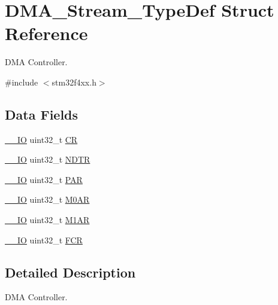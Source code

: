 \hypertarget{struct_d_m_a___stream___type_def}{\section{D\-M\-A\-\_\-\-Stream\-\_\-\-Type\-Def Struct Reference}
\label{struct_d_m_a___stream___type_def}
}


D\-M\-A Controller.  




{\ttfamily \#include $<$stm32f4xx.\-h$>$}

\subsection*{Data Fields}
\begin{DoxyCompactItemize}
\item 
\hyperlink{group___c_m_s_i_s__core__definitions_gaec43007d9998a0a0e01faede4133d6be}{\-\_\-\-\_\-\-I\-O} uint32\-\_\-t \hyperlink{struct_d_m_a___stream___type_def_ab40c89c59391aaa9d9a8ec011dd0907a}{C\-R}
\item 
\hyperlink{group___c_m_s_i_s__core__definitions_gaec43007d9998a0a0e01faede4133d6be}{\-\_\-\-\_\-\-I\-O} uint32\-\_\-t \hyperlink{struct_d_m_a___stream___type_def_af60258ad5a25addc1e8969665d0c1731}{N\-D\-T\-R}
\item 
\hyperlink{group___c_m_s_i_s__core__definitions_gaec43007d9998a0a0e01faede4133d6be}{\-\_\-\-\_\-\-I\-O} uint32\-\_\-t \hyperlink{struct_d_m_a___stream___type_def_aef55be3d948c22dd32a97e8d4f8761fd}{P\-A\-R}
\item 
\hyperlink{group___c_m_s_i_s__core__definitions_gaec43007d9998a0a0e01faede4133d6be}{\-\_\-\-\_\-\-I\-O} uint32\-\_\-t \hyperlink{struct_d_m_a___stream___type_def_a63b4d166f4ab5024db6b493a7ab7b640}{M0\-A\-R}
\item 
\hyperlink{group___c_m_s_i_s__core__definitions_gaec43007d9998a0a0e01faede4133d6be}{\-\_\-\-\_\-\-I\-O} uint32\-\_\-t \hyperlink{struct_d_m_a___stream___type_def_aee7782244ceb4791d9a3891804ac47ac}{M1\-A\-R}
\item 
\hyperlink{group___c_m_s_i_s__core__definitions_gaec43007d9998a0a0e01faede4133d6be}{\-\_\-\-\_\-\-I\-O} uint32\-\_\-t \hyperlink{struct_d_m_a___stream___type_def_a5d5cc7f32884945503dd29f8f6cbb415}{F\-C\-R}
\end{DoxyCompactItemize}


\subsection{Detailed Description}
D\-M\-A Controller. 

